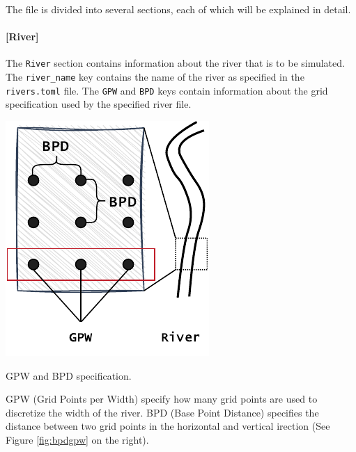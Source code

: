 \documentclass[
	a4paper, %
	12pt, %
]{persist}
\begin{document}
The file is divided into several sections, each of which will be explained in detail. 

\paragraph{[River]}

The \verb|River| section contains information about the river that is to be simulated. The \verb|river_name| key contains the name of the river as specified in the \verb|rivers.toml| file. The \verb|GPW| and \verb|BPD| keys contain information about the grid specification used by the specified river file. 

\begin{marginfigure}
	\includegraphics[width=\linewidth]{img/bpdgpw.pdf}
	\caption{GPW and BPD specification.}
	\label{fig:bpdgpw}
\end{marginfigure}

GPW (Grid Points per Width) specify how many grid points are used to discretize the width of the river. BPD (Base Point Distance) specifies the distance between two grid points in the horizontal and vertical irection (See Figure \ref{fig:bpdgpw} on the right). 
\end{document}
